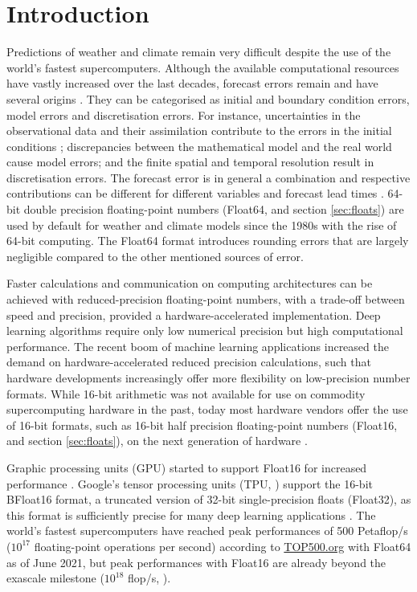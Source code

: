 \section{Introduction}

Predictions of weather and climate remain very difficult despite the use of the world's fastest supercomputers. Although the available
computational resources have vastly increased over the last decades, forecast errors remain and have several origins
\citep{Palmer2012,Palmer2015}. They can be categorised as initial and boundary condition errors, model errors and discretisation
errors. For instance, uncertainties in the observational data and their assimilation contribute to the errors in the initial conditions
\citep{Ghil1991}; discrepancies between the mathematical model and the real world cause model errors; and the finite spatial and
temporal resolution result in discretisation errors. The forecast error is in general a combination and respective contributions can be
different for different variables and forecast lead times \citep{Jung2010,Palmer2019a}. 64-bit double precision floating-point numbers
(Float64, \cite{IEEE1985} and section \ref{sec:floats}) are used by default for weather and climate models since the 1980s with the
rise of 64-bit computing. The Float64 format introduces rounding errors \citep{Higham2002} that are largely negligible compared
to the other mentioned sources of error.

Faster calculations and communication on computing architectures can be achieved with reduced-precision floating-point numbers,
with a trade-off between speed and precision, provided a hardware-accelerated implementation. Deep learning algorithms require
only low numerical precision \citep{Wang2018,Sun2020} but high computational performance. The recent boom of machine learning
applications increased the demand on hardware-accelerated reduced precision calculations, such that hardware developments
increasingly offer more flexibility on low-precision number formats. While 16-bit arithmetic was not available for use on commodity
supercomputing hardware in the past, today most hardware vendors offer the use of 16-bit formats, such as 16-bit half precision
floating-point numbers (Float16, \cite{IEEE2008} and section \ref{sec:floats}), on the next generation of hardware
\citep{Sato2020,Burgess2019}.

Graphic processing units (GPU) started to support Float16 for increased performance \citep{Markidis2018}. Google's tensor processing
units (TPU, \cite{Jouppi2017,Jouppi2018}) support the 16-bit BFloat16 format, a truncated version of 32-bit single-precision floats (Float32),
as this format is sufficiently precise for many deep learning applications \citep{Kalamkar2019,Burgess2019,Gupta2015}. The world's fastest
supercomputers have reached peak performances of 500 Petaflop/s ($10^{17}$
floating-point operations per second) according to \href{https://top500.org}{TOP500.org} \citep{Dongarra2011} with Float64 as of June 2021,
but peak performances with Float16 are already beyond the exascale milestone ($10^{18}$ flop/s, \cite{Kurth2018,Kudo2020a}).


